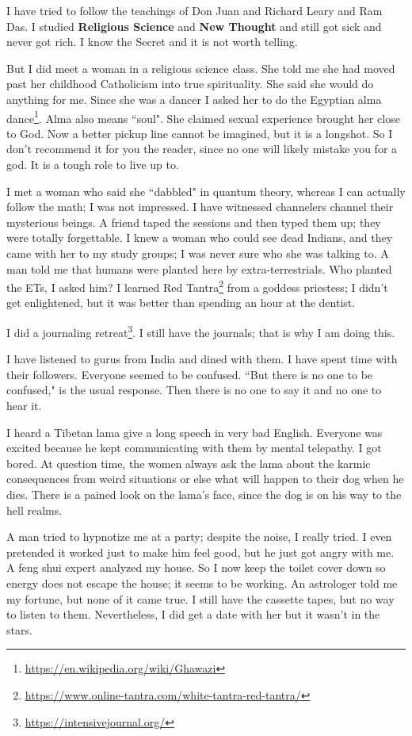 I have tried to follow the teachings of Don Juan and Richard Leary and Ram Das. I studied \textbf{Religious Science} and \textbf{New Thought} and still got sick and never got rich. I know the Secret and it is not worth telling. 

But I did meet a woman in a religious science class. She told me she had moved past her childhood Catholicism into true spirituality. She said she would do anything for me. Since she was a dancer I asked her to do the Egyptian alma dance\footnote{\url{https://en.wikipedia.org/wiki/Ghawazi}}. Alma also means ``soul". She claimed sexual experience brought her close to God. Now a better pickup line cannot be imagined, but it is a longshot. So I don't recommend it for you the reader, since no one will likely mistake you for a god. It is a tough role to live up to.

I met a woman who said she ``dabbled" in quantum theory, whereas I can actually follow the math; I was not impressed. I have witnessed channelers channel their mysterious beings. A friend taped the sessions and then typed them up; they were totally forgettable. I knew a woman who could see dead Indians, and they came with her to my study groups; I was never sure who she was talking to. A man told me that humans were planted here by extra-terrestrials. Who planted the ETs, I asked him? I learned Red Tantra\footnote{\url{https://www.online-tantra.com/white-tantra-red-tantra/}} from a goddess priestess; I didn't get enlightened, but it was better than spending an hour at the dentist.

I did a journaling retreat\footnote{\url{https://intensivejournal.org/}}. I still have the journals; that is why I am doing this.

I have listened to gurus from India and dined with them. I have spent time with their followers. Everyone seemed to be confused. ``But there is no one to be confused," is the usual response. Then there is no one to say it and no one to hear it.

I heard a Tibetan lama give a long speech in very bad English. Everyone was excited because he kept communicating with them by mental telepathy. I got bored. At question time, the women always ask the lama about the karmic consequences from weird situations or else what will happen to their dog when he dies. There is a pained look on the lama's face, since the dog is on his way to the hell realms.

A man tried to hypnotize me at a party; despite the noise, I really tried. I even pretended it worked just to make him feel good, but he just got angry with me. A feng shui expert analyzed my house. So I now keep the toilet cover down so energy does not escape the house; it seems to be working. An astrologer told me my fortune, but none of it came true. I still have the cassette tapes, but no way to listen to them. Nevertheless, I did get a date with her but it wasn't in the stars.

